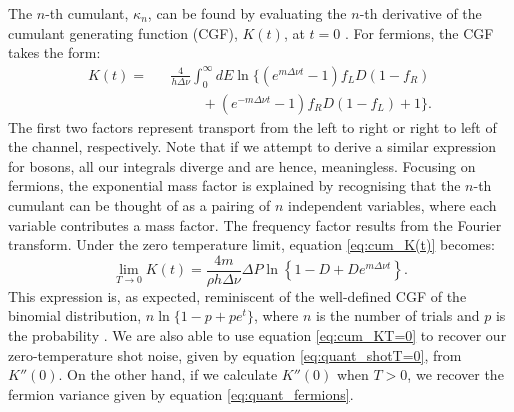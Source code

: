 \documentclass[%
 reprint,
 aps,
 prb,
 epsf,
]{revtex4-2}
\begin{document}
    The $n$-th cumulant, $\kappa_n$, can be found by evaluating the $n$-th derivative of the cumulant generating function (CGF), $K(t)$, at $t=0$ \cite{FullCounting}. For fermions, the CGF takes the form:
    \begin{eqnarray}\label{eq:cum_K(t)}\nonumber
        K(t) =&&\frac{4}{h\Delta\nu} \int_0^\infty dE\ln\{\left(e^{m\Delta\nu t}-1\right) f_L D(1-f_R) \\
        &&\;\;\;\;\;\;\;\;+\left(e^{-m\Delta\nu t} - 1 \right) f_RD(1-f_L)+1\}.
    \end{eqnarray}
    The first two factors represent transport from the left to right or right to left of the channel, respectively. Note that if we attempt to derive a similar expression for bosons, all our integrals diverge and are hence, meaningless. Focusing on fermions, the exponential mass factor is explained by recognising that the $n$-th cumulant can be thought of as a pairing of $n$ independent variables, where each variable contributes a mass factor. The frequency factor results from the Fourier transform. Under the zero temperature limit, equation \ref{eq:cum_K(t)} becomes:
    \begin{equation}\label{eq:cum_KT=0}
        \lim_{T \to 0} K(t) = \frac{4m}{\rho h\Delta\nu}\Delta P \ln \left\{1-D+De^{m\Delta\nu t} \right\}.
    \end{equation}
    This expression is, as expected, reminiscent of the well-defined CGF of the binomial distribution, $n\ln\{1-p+pe^t\}$, where $n$ is the number of trials and $p$ is the probability \cite{FullCounting}. We are also able to use equation \ref{eq:cum_KT=0} to recover our zero-temperature shot noise, given by equation \ref{eq:quant_shotT=0}, from $K''(0)$. On the other hand, if we calculate $K''(0)$ when $T>0$, we recover the fermion variance given by equation \ref{eq:quant_fermions}. \\
    
\end{document}
